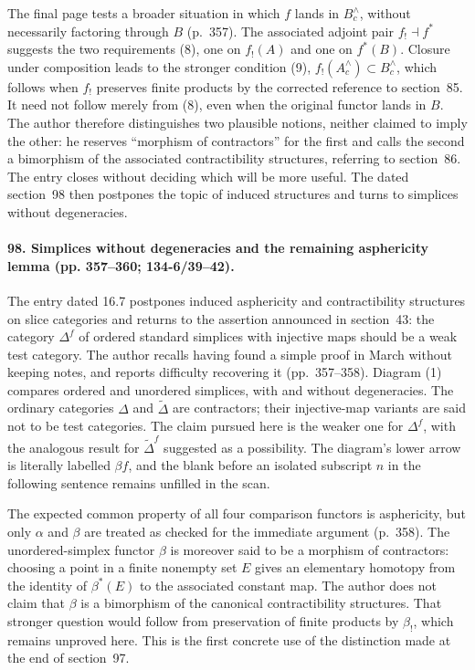 The final page tests a broader situation in which $f$ lands in $B^{\wedge}_c$, without necessarily factoring through $B$ (p.~357). The associated adjoint pair $f_!\dashv f^*$ suggests the two requirements (8), one on $f_!(A)$ and one on $f^*(B)$. Closure under composition leads to the stronger condition (9), $f_!(A^{\wedge}_c)\subset B^{\wedge}_c$, which follows when $f_!$ preserves finite products by the corrected reference to section~85. It need not follow merely from (8), even when the original functor lands in $B$. The author therefore distinguishes two plausible notions, neither claimed to imply the other: he reserves ``morphism of contractors'' for the first and calls the second a bimorphism of the associated contractibility structures, referring to section~86. The entry closes without deciding which will be more useful. The dated section~98 then postpones the topic of induced structures and turns to simplices without degeneracies.

\paragraph{98. Simplices without degeneracies and the remaining asphericity lemma (pp. 357--360; 134-6/39--42).}
The entry dated 16.7 postpones induced asphericity and contractibility structures on slice categories and returns to the assertion announced in section~43: the category $\Delta^f$ of ordered standard simplices with injective maps should be a weak test category. The author recalls having found a simple proof in March without keeping notes, and reports difficulty recovering it (pp.~357--358). Diagram (1) compares ordered and unordered simplices, with and without degeneracies. The ordinary categories $\Delta$ and $\widetilde\Delta$ are contractors; their injective-map variants are said not to be test categories. The claim pursued here is the weaker one for $\Delta^f$, with the analogous result for $\widetilde\Delta^f$ suggested as a possibility. The diagram's lower arrow is literally labelled $\beta f$, and the blank before an isolated subscript $n$ in the following sentence remains unfilled in the scan.

The expected common property of all four comparison functors is asphericity, but only $\alpha$ and $\beta$ are treated as checked for the immediate argument (p.~358). The unordered-simplex functor $\beta$ is moreover said to be a morphism of contractors: choosing a point in a finite nonempty set $E$ gives an elementary homotopy from the identity of $\beta^*(E)$ to the associated constant map. The author does not claim that $\beta$ is a bimorphism of the canonical contractibility structures. That stronger question would follow from preservation of finite products by $\beta_!$, which remains unproved here. This is the first concrete use of the distinction made at the end of section~97.

